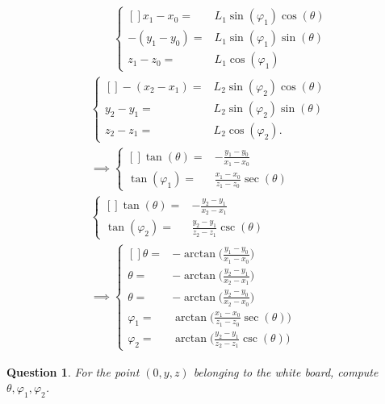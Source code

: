 \documentclass{article}
\newtheorem{question}{Question}
\begin{document}
\begin{align}
\phantom{\implies}
\left\{
\begin{aligned}[]
x_{1}-x_{0}={}&L_{1}\sin(\varphi_{1})\cos(\theta)\\
-(y_{1}-y_{0})={}&L_{1}\sin(\varphi_{1})\sin(\theta)\\
z_{1}-z_{0}={}&L_{1}\cos(\varphi_{1})
\end{aligned}
\right.\nonumber\\
\left\{
\begin{aligned}[]
-(x_{2}-x_{1})={}&L_{2}\sin(\varphi_{2})\cos(\theta)\\
y_{2}-y_{1}={}&L_{2}\sin(\varphi_{2})\sin(\theta)\\
z_{2}-z_{1}={}&L_{2}\cos(\varphi_{2}).
\end{aligned}\right.\nonumber\\
\implies
\left\{
\begin{aligned}[]
\tan(\theta)={}&-\frac{y_{1}-y_{0}}{x_{1}-x_{0}}\\
\tan(\varphi_{1})={}&\frac{x_{1}-x_{0}}{z_{1}-z_{0}}\sec(\theta)
\end{aligned}\right.\nonumber\\
\left\{
\begin{aligned}[]
\tan(\theta)={}&-\frac{y_{2}-y_{1}}{x_{2}-x_{1}}\\
\tan(\varphi_{2})={}&\frac{y_{2}-y_{1}}{z_{2}-z_{1}}\csc(\theta)
\end{aligned}\right.\nonumber\\
\implies
\left\{
\begin{aligned}[]
\theta={}&-\arctan\Biggl(\frac{y_{1}-y_{0}}{x_{1}-x_{0}}\Biggr)\\
\theta={}&-\arctan\Biggl(\frac{y_{2}-y_{1}}{x_{2}-x_{1}}\Biggr)\\
\theta={}&-\arctan\Biggl(\frac{y_{2}-y_{0}}{x_{2}-x_{0}}\Biggr)\\
\varphi_{1}={}&\arctan\Biggl(\frac{x_{1}-x_{0}}{z_{1}-z_{0}}\sec(\theta)\Biggr)\\
\varphi_{2}={}&\arctan\Biggl(\frac{y_{2}-y_{1}}{z_{2}-z_{1}}\csc(\theta)\Biggr)
\end{aligned}\right.\nonumber
\end{align}

\begin{question}
For the point $(0,y,z)$ belonging to the white board, compute $\theta,\varphi_{1},\varphi_{2}$.
\end{question}
\end{document}
